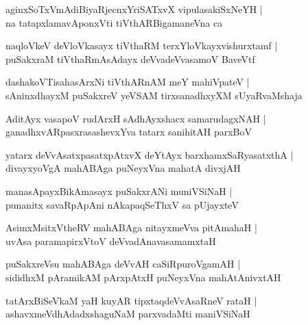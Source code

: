 \documentclass[twoside,12pt,openright]{book}
\newcounter{shloka}[chapter]
\begin{document}
\begin{shloka}
aginxSoTxVmAdiBiyaRjecnxYriSATxvX vipulasakiSxNeYH |\\
na tatapxlamavAponxVti tiVthARBigamaneVna ca
\end{shloka}

\begin{shloka}
naqloVkeV deVloVkasayx tiVthaRM terxYloVkayxvishurxtamf |\\
puSakxraM tiVthaRmAsAdayx deVvadeVvasamoV BaveVtf 
\end{shloka}

\begin{shloka}
dashakoVTisahasArxNi tiVthARnAM meY mahiVpateV |\\
sAninxdhayxM puSakxreV yeVSAM tirxsanadhxyXM sUyaRvaMshaja
\end{shloka}

\begin{shloka}
AditAyx vasapoV rudArxH sAdhAyxshacx samarudagxNAH |\\
ganadhxvARpasxrasashevxYva tatarx sanihitAH parxBoV 
\end{shloka}

\begin{shloka}
yatarx deVvAsatxpasatxpAtxvX deYtAyx barxhamxSaRyasatxthA |\\
divayxyoVgA mahABAga puNeyxVna mahatA divxjAH 
\end{shloka}

\begin{shloka}
manasApayxBikAmasayx puSakxrANi muniVSiNaH |\\
punanitx savaRpApAni nAkapaqSeThxV sa pUjayxteV
\end{shloka}

\begin{shloka}
AsimxMsitxVtheRV mahABAga nitayxmeVva pitAmahaH |\\
uvAsa paramapirxVtoV deVvadAnavasamamxtaH 
\end{shloka}

\begin{shloka}
puSakxreVsu mahABAga deVvAH caSiRpuroVgamAH |\\
sididhxM pAramikAM pArxpAtxH puNeyxVna mahAtAnivxtAH
\end{shloka}

\begin{shloka}
tatArxBiSeVkaM yaH kuyAR tipxtaqdeVvAsaRneV rataH |\\
ashavxmeVdhAdadxshaguNaM parxvadaMti maniVSiNaH
\end{shloka}
\end{document}
